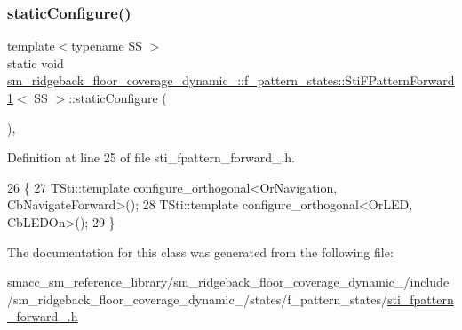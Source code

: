 \subsubsection{\texorpdfstring{static\+Configure()}{staticConfigure()}}
{\footnotesize\ttfamily template$<$typename SS $>$ \\
static void \hyperlink{structsm__ridgeback__floor__coverage__dynamic__1_1_1f__pattern__states_1_1StiFPatternForward1}{sm\+\_\+ridgeback\+\_\+floor\+\_\+coverage\+\_\+dynamic\+\_\+::f\+\_\+pattern\+\_\+states\+::\+Sti\+F\+Pattern\+Forward1}$<$ SS $>$\+::static\+Configure (\begin{DoxyParamCaption}{ }\end{DoxyParamCaption})\hspace{0.3cm}{\ttfamily [inline]}, {\ttfamily [static]}}



Definition at line 25 of file sti\+\_\+fpattern\+\_\+forward\+\_.\+h.


\begin{DoxyCode}
26   \{
27     TSti::template configure\_orthogonal<OrNavigation, CbNavigateForward>();
28     TSti::template configure\_orthogonal<OrLED, CbLEDOn>();
29   \}
\end{DoxyCode}


The documentation for this class was generated from the following file\+:\begin{DoxyCompactItemize}
\item 
smacc\+\_\+sm\+\_\+reference\+\_\+library/sm\+\_\+ridgeback\+\_\+floor\+\_\+coverage\+\_\+dynamic\+\_/include/sm\+\_\+ridgeback\+\_\+floor\+\_\+coverage\+\_\+dynamic\+\_/states/f\+\_\+pattern\+\_\+states/\hyperlink{sm__ridgeback__floor__coverage__dynamic__1_2include_2sm__ridgeback__floor__coverage__dynamic__1_39e0413a8fc26b42079b1d3d7616d912}{sti\+\_\+fpattern\+\_\+forward\+\_.\+h}\end{DoxyCompactItemize}
